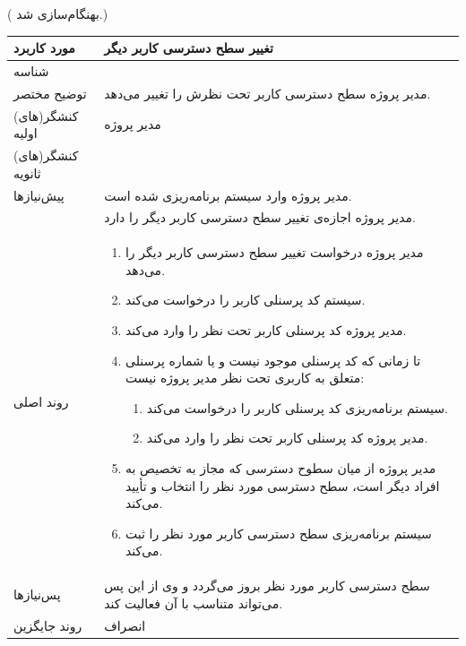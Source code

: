 \newpage
({\color{red} بهنگام‌سازی شد.})
\begin{table}[H]
	\centering
	\begin{tabular}{|p{3cm}|p{10cm}|}
		\hline
		مورد کاربرد & تغییر سطح دسترسی کاربر دیگر  \\
		\hline
		شناسه & 
		\stepcounter{usecase_ID}
		\arabic{usecase_ID} \\
		\hline
		توضیح مختصر & مدیر پروژه سطح دسترسی کاربر تحت نظرش را تغییر می‌دهد. \\
		\hline
		کنشگر(های) اولیه & مدیر پروژه \\
		\hline
		کنشگر(های) ثانویه &  \\
		\hline
		پیش‌نیازها & مدیر پروژه وارد سیستم برنامه‌ریزی شده است. \\
				& مدیر پروژه اجازه‌ی تغییر سطح دسترسی کاربر دیگر را دارد.\\
		\hline
		
		روند اصلی &
		\begin{enumerate}[topsep=0cm,leftmargin=0.5cm]
			\item مدیر پروژه درخواست تغییر سطح دسترسی کاربر دیگر را می‌دهد.
			\item سیستم کد پرسنلی کاربر را درخواست می‌کند.
			\item مدیر پروژه کد پرسنلی کاربر تحت نظر را وارد می‌کند. 
			\item تا زمانی که کد پرسنلی موجود نیست و یا شماره پرسنلی متعلق به کاربری تحت نظر مدیر پروژه نیست:
			\begin{enumerate}[topsep=0cm,leftmargin=0.5cm]
				\item سیستم برنامه‌ریزی کد پرسنلی کاربر را درخواست می‌کند.
				\item مدیر پروژه کد پرسنلی کاربر تحت نظر را وارد می‌کند.
			\end{enumerate}
			\item مدیر پروژه از میان سطوح دسترسی که مجاز به تخصیص به افراد دیگر است، سطح دسترسی مورد نظر را انتخاب و تأ‌یید می‌کند.
			\item سیستم برنامه‌ریزی سطح دسترسی کاربر مورد نظر را ثبت می‌کند.
		\end{enumerate} \\
		
		\hline
		پس‌نیازها & سطح دسترسی کاربر مورد نظر بروز می‌گردد و وی از این پس می‌تواند متناسب با آن فعالیت کند. \\
		\hline
		روند جایگزین & انصراف \\
		\hline
	\end{tabular}
\end{table}




